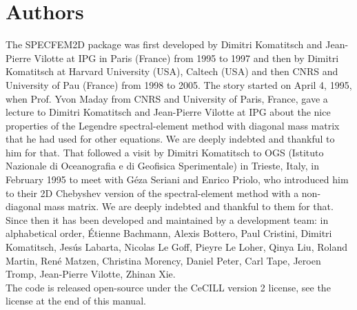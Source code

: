 \documentclass[oneside,english,onecolumn,letterpaper]{book}
\begin{document}
\section*{Authors}
The SPECFEM2D package was first developed by Dimitri Komatitsch and Jean-Pierre Vilotte at IPG in Paris (France) from 1995 to 1997
and then by Dimitri Komatitsch at Harvard University (USA), Caltech (USA) and then CNRS and University of Pau (France) from 1998 to 2005.
The story started on April 4, 1995, when Prof. Yvon Maday from CNRS and University of Paris, France, gave a lecture to
Dimitri Komatitsch and Jean-Pierre Vilotte at IPG about the nice properties of the Legendre spectral-element method with diagonal mass matrix that he had used for
other equations. We are deeply indebted and thankful to him for that.
That followed a visit by Dimitri Komatitsch to OGS (Istituto Nazionale di Oceanografia e di Geofisica Sperimentale) in Trieste, Italy, in February 1995
to meet with G\'eza Seriani and Enrico Priolo, who introduced him to their 2D Chebyshev version of the spectral-element method with a non-diagonal mass matrix.
We are deeply indebted and thankful to them for that.\\

Since then it has been developed and maintained by a development team: in alphabetical order,
\'Etienne Bachmann,
Alexis Bottero,
Paul Cristini,
Dimitri Komatitsch,
Jes\'us Labarta,
Nicolas Le Goff,
Pieyre Le Loher,
Qinya Liu,
Roland Martin,
Ren\'e Matzen,
Christina Morency,
Daniel Peter,
Carl Tape,
Jeroen Tromp,
Jean-Pierre Vilotte,
Zhinan Xie.\\

The code is released open-source under the CeCILL version 2 license, see the license at the end of this manual.\\

\newpage{}
\end{document}
